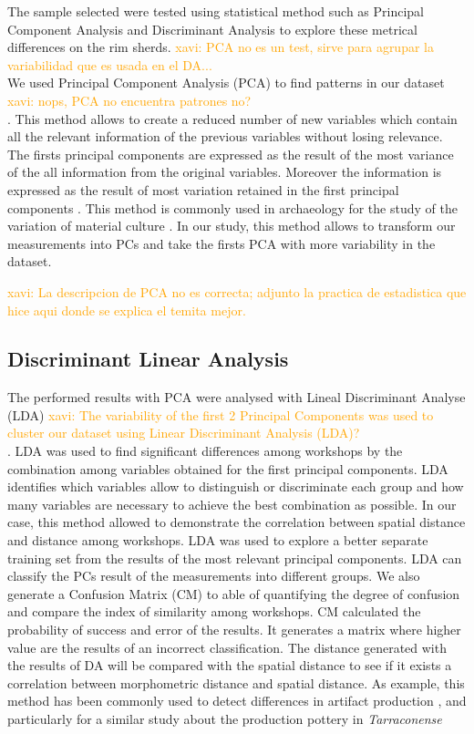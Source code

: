 \documentclass[review]{elsarticle}
\newcommand{\memo}[2]{\textcolor{#1}{#2}}
\newcommand{\xavi}[1]{\memo{orange}{xavi: #1\\}}
\begin{document}
The sample selected were tested using statistical method such as Principal Component Analysis and Discriminant Analysis to explore these metrical differences on the rim sherds. \xavi{PCA no es un test, sirve para agrupar la variabilidad que es usada en el DA...} 
We used Principal Component Analysis (PCA) to find patterns in our dataset \xavi{nops, PCA no encuentra patrones no?}. This method allows to create a reduced number of new variables which contain all the relevant information of the previous variables without losing relevance. The firsts principal components are expressed as the result of the most variance of the all information from the original variables. Moreover the information is expressed as the result of most variation retained in the first principal components \citep{jolliffe_principal_2002, shennan_quantifying_1997}. This method is commonly used in archaeology for the study of the variation of material culture \citep{li_crossbows_2014, schillinger_differences_2016}. In our study, this method allows to transform our measurements into PCs and take the firsts PCA with more variability in the dataset.  

\xavi{La descripcion de PCA no es correcta; adjunto la practica de estadistica que hice aqui donde se explica el temita mejor.}

\subsection{Discriminant Linear Analysis} 


The performed results with PCA were analysed with Lineal Discriminant Analyse (LDA) \xavi{The variability of the first 2 Principal Components was used to cluster our dataset using Linear Discriminant Analysis (LDA)?}. LDA was used to find significant differences among workshops by the combination among variables obtained for the first principal components. LDA identifies which variables allow to distinguish or discriminate each group and how many variables are necessary to achieve the best combination as possible. In our case, this method allowed to demonstrate the correlation between spatial distance and distance among workshops. LDA was used to explore a better separate training set from the results of the most relevant principal components. LDA can classify the PCs result of the measurements into different groups.  We also generate a Confusion Matrix (CM) to able of quantifying the degree of confusion and compare the index of similarity among workshops.  CM calculated the probability of success and error of the results. It generates a matrix where higher value are the results of an incorrect classification. The distance generated with the results of DA will be compared with the spatial distance to see if it exists a correlation between morphometric distance and spatial distance. As example, this method has been commonly used to detect differences in artifact production \citep{charlton_investigating_2012, thorpe_distribution_1984}, and particularly for a similar study about the production pottery in \emph{Tarraconense} \citep{i_martin_alisis_1998}
\end{document}
